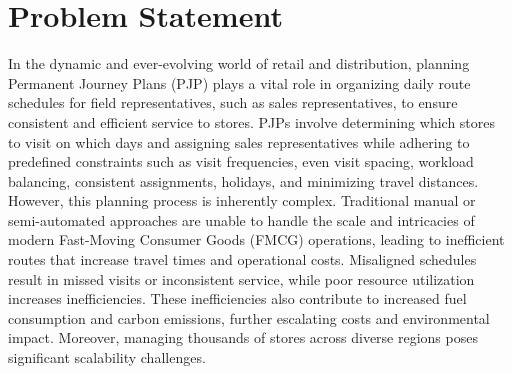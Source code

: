 


\section{Problem Statement}



In the dynamic and ever-evolving world of retail and distribution, planning Permanent Journey Plans (PJP) plays a vital role in organizing daily route schedules for field representatives, such as sales representatives, to ensure consistent and efficient service to stores. PJPs involve determining which stores to visit on which days and assigning sales representatives while adhering to predefined constraints such as visit frequencies, even visit spacing, workload balancing, consistent assignments, holidays, and minimizing travel distances.
However, this planning process is inherently complex. Traditional manual or semi-automated approaches are unable to handle the scale and intricacies of modern Fast-Moving Consumer Goods (FMCG) operations, leading to inefficient routes that increase travel times and operational costs. Misaligned schedules result in missed visits or inconsistent service, while poor resource utilization increases inefficiencies. These inefficiencies also contribute to increased fuel consumption and carbon emissions, further escalating costs and environmental impact. Moreover, managing thousands of stores across diverse regions poses significant scalability challenges.


